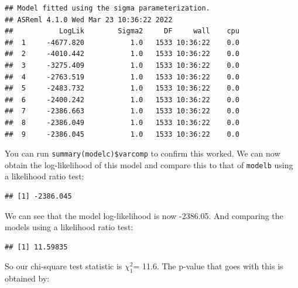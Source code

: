 \documentclass[
  12pt,
]{book}
\newenvironment{Shaded}{\begin{snugshade}}{\end{snugshade}}
\newcommand{\DecValTok}[1]{\textcolor[rgb]{0.00,0.00,0.81}{#1}}
\newcommand{\KeywordTok}[1]{\textcolor[rgb]{0.13,0.29,0.53}{\textbf{#1}}}
\newcommand{\NormalTok}[1]{#1}
\newcommand{\OperatorTok}[1]{\textcolor[rgb]{0.81,0.36,0.00}{\textbf{#1}}}
\newcommand{\StringTok}[1]{\textcolor[rgb]{0.31,0.60,0.02}{#1}}
\begin{document}
\begin{verbatim}
## Model fitted using the sigma parameterization.
## ASReml 4.1.0 Wed Mar 23 10:36:22 2022
##           LogLik        Sigma2     DF     wall    cpu
##  1     -4677.820           1.0   1533 10:36:22    0.0
##  2     -4010.442           1.0   1533 10:36:22    0.0
##  3     -3275.409           1.0   1533 10:36:22    0.0
##  4     -2763.519           1.0   1533 10:36:22    0.0
##  5     -2483.732           1.0   1533 10:36:22    0.0
##  6     -2400.242           1.0   1533 10:36:22    0.0
##  7     -2386.663           1.0   1533 10:36:22    0.0
##  8     -2386.049           1.0   1533 10:36:22    0.0
##  9     -2386.045           1.0   1533 10:36:22    0.0
\end{verbatim}

You can run \texttt{summary(modelc)\$varcomp} to confirm this worked. We can now obtain the log-likelihood of this model and compare this to that of \texttt{modelb} using a likelihood ratio test:

\begin{Shaded}
\end{Shaded}

\begin{verbatim}
## [1] -2386.045
\end{verbatim}

We can see that the model log-likelihood is now -2386.05.
And comparing the models using a likelihood ratio test:

\begin{Shaded}
\end{Shaded}

\begin{verbatim}
## [1] 11.59835
\end{verbatim}

So our chi-square test statistic is \(\chi^2_1\)= 11.6.
The p-value that goes with this is obtained by:

\begin{Shaded}
\end{Shaded}
\end{document}
